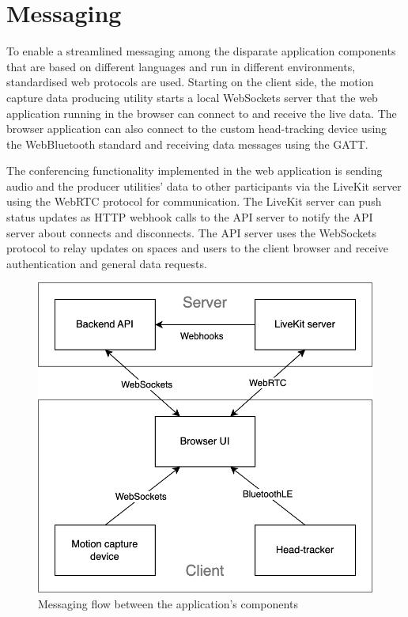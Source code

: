\section{Messaging}
\label{sec:messaging}

To enable a streamlined messaging among the disparate application components that are based on different languages and run in different environments, standardised web protocols are used.
Starting on the client side, the motion capture data producing utility starts a local WebSockets server that the web application running in the browser can connect to and receive the live data.
The browser application can also connect to the custom head-tracking device using the WebBluetooth standard and receiving data messages using the \ac{GATT}.

The conferencing functionality implemented in the web application is sending audio and the producer utilities' data to other participants via the LiveKit server using the WebRTC protocol for communication.
The LiveKit server can push status updates as \ac{HTTP} webhook calls to the API server to notify the \ac{API} server about connects and disconnects.
The \ac{API} server uses the WebSockets protocol to relay updates on spaces and users to the client browser and receive authentication and general data requests.

\begin{figure}[h]
\centering
\includegraphics[scale=0.4]{04_Artefakte/01_Abbildungen/application-messaging-flow}
\caption[Application messaging flow]{Messaging flow between the application's components\protect}
\label{fig:messagingFlow}
\end{figure}

